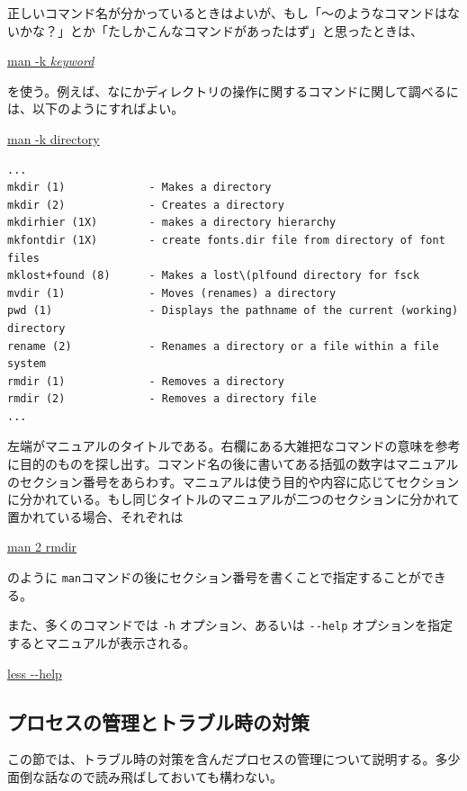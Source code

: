正しいコマンド名が分かっているときはよいが、もし「〜のようなコマンドはないかな？」とか「たしかこんなコマンドがあったはず」と思ったときは、
\begin{commandline2}
    \prompt \underline{man -k \textit{keyword}}
\end{commandline2} \noindent
を使う。例えば、なにかディレクトリの操作に関するコマンドに関して調べるには、以下のようにすればよい。
\begin{commandline2}
    \prompt \underline{man -k directory}
    \vspace*{-.8em}
    \begin{verbatim}
...
mkdir (1)             - Makes a directory
mkdir (2)             - Creates a directory
mkdirhier (1X)        - makes a directory hierarchy
mkfontdir (1X)        - create fonts.dir file from directory of font files
mklost+found (8)      - Makes a lost\(plfound directory for fsck
mvdir (1)             - Moves (renames) a directory
pwd (1)               - Displays the pathname of the current (working) directory
rename (2)            - Renames a directory or a file within a file system
rmdir (1)             - Removes a directory
rmdir (2)             - Removes a directory file
...
\end{verbatim}
\end{commandline2} \noindent
\noindent 左端がマニュアルのタイトルである。右欄にある大雑把なコマンドの意味を参考に目的のものを探し出す。コマンド名の後に書いてある括弧の数字はマニュアルのセクション番号をあらわす。マニュアルは使う目的や内容に応じてセクションに分かれている。もし同じタイトルのマニュアルが二つのセクションに分かれて置かれている場合、それぞれは
\begin{commandline2}
    \prompt \underline{man 2 rmdir}
\end{commandline2} \noindent
のように \texttt{man}コマンドの後にセクション番号を書くことで指定することができる。

また、多くのコマンドでは \texttt{-h} オプション、あるいは \texttt{-{}-help} オプションを指定するとマニュアルが表示される。
\begin{commandline2}
    \prompt \underline{less -{}-help}
\end{commandline2} \noindent

\subsection{プロセスの管理とトラブル時の対策}
\label{chap: recover}
この節では、トラブル時の対策を含んだプロセスの管理について説明する。多少面倒な話なので読み飛ばしておいても構わない。

